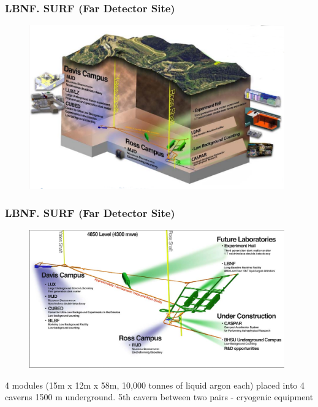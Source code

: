 \begin{frame}\frametitle{LBNF. SURF (Far Detector Site)}
\begin{figure}
\label{fig:farDetector_SURF1}
\centering
\includegraphics[width=0.98\textwidth, keepaspectratio=true]{figs/farDetector_SanfordUndergroundResearchFacility.png}
\end{figure}
\end{frame}

\begin{frame}\frametitle{LBNF. SURF (Far Detector Site)}
\begin{figure}
\label{fig:farDetector_SURF2}
\centering
\includegraphics[width=0.98\textwidth, keepaspectratio=true]{figs/farDetector_wholeLab.png}
\end{figure}
\scriptsize
4 modules (15m x 12m x 58m, 10,000 tonnes of liquid argon each) placed into 4 caverns 1500 m underground. 5th cavern between two pairs - cryogenic equipment\\
\end{frame}

